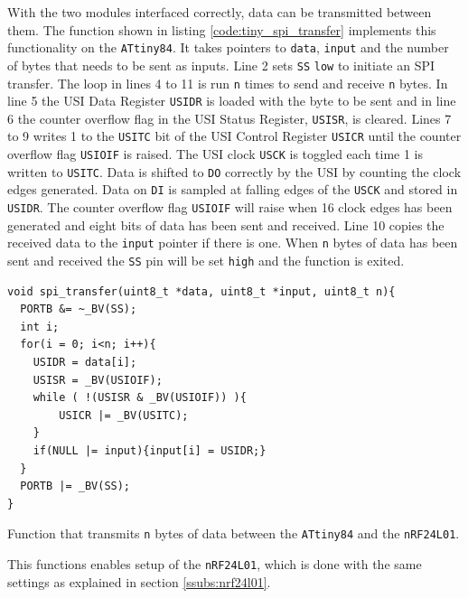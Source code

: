 {With the two modules interfaced correctly, data can be transmitted between them.
The function shown in listing \ref{code:tiny_spi_transfer} implements this functionality on the \texttt{ATtiny84}.
It takes pointers to \texttt{data}, \texttt{input} and the number of bytes that needs to be sent as inputs.
Line 2 sets \texttt{SS} \texttt{low} to initiate an SPI transfer.
The loop in lines 4 to 11 is run \texttt{n} times to send and receive \texttt{n} bytes.
In line 5 the USI Data Register \texttt{USIDR} is loaded with the byte to be sent and in line 6 the counter overflow flag in the USI Status Register, \texttt{USISR}, is cleared.
Lines 7 to 9 writes 1 to the \texttt{USITC} bit of the USI Control Register \texttt{USICR} until the counter overflow flag \texttt{USIOIF} is raised.
The USI clock \texttt{USCK} is toggled each time 1 is written to \texttt{USITC}.
Data is shifted to \texttt{DO} correctly by the USI by counting the clock edges generated. 
Data on \texttt{DI} is sampled at falling edges of the \texttt{USCK} and stored in \texttt{USIDR}.
The counter overflow flag \texttt{USIOIF} will raise when 16 clock edges has been generated and eight bits of data has been sent and received.
Line 10 copies the received data to the \texttt{input} pointer if there is one.
When \texttt{n} bytes of data has been sent and received the \texttt{SS} pin will be set \texttt{high} and the function is exited.
\begin{listing}[h] 
\begin{verbatim}
void spi_transfer(uint8_t *data, uint8_t *input, uint8_t n){
  PORTB &= ~_BV(SS);
  int i;
  for(i = 0; i<n; i++){
	USIDR = data[i];
	USISR = _BV(USIOIF);  
	while ( !(USISR & _BV(USIOIF)) ){
		USICR |= _BV(USITC);  
	} 
	if(NULL |= input){input[i] = USIDR;}
  }
  PORTB |= _BV(SS);
}
\end{verbatim}
\caption{Function that transmits \texttt{n} bytes of data between the \texttt{ATtiny84} and the \texttt{nRF24L01}.}
\label{code:tiny_spi_transfer}
\end{listing}

This functions enables setup of the \texttt{nRF24L01}, which is done with the same settings as explained in section \ref{ssubs:nrf24l01}.


}
